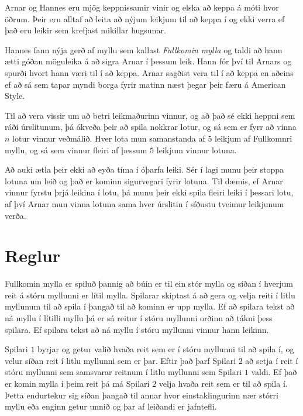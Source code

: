 

Arnar og Hannes eru mjög keppnissamir vinir og elska að keppa á móti hvor öðrum. Þeir
eru alltaf að leita að nýjum leikjum til að keppa í og ekki verra ef það eru leikir
sem krefjast mikillar hugsunar.

Hannes fann nýja gerð af myllu sem kallast \emph{Fullkomin mylla}
og taldi að hann ætti góðan möguleika á að sigra Arnar í þessum leik. Hann fór því
til Arnars og spurði hvort hann væri til í að keppa. Arnar sagðist vera til í að keppa
en aðeins ef að sá sem tapar myndi borga fyrir matinn næst þegar þeir færu á 
American Style.

Til að vera vissir um að betri leikmaðurinn vinnur, og að það sé ekki heppni
sem ráði úrslitunum, þá ákveða þeir að spila nokkrar lotur, og sá sem er fyrr
að vinna $n$ lotur vinnur veðmálið. Hver lota mun samanstanda af $5$ leikjum af
Fullkomnri myllu, og sá sem vinnur fleiri af þessum $5$ leikjum vinnur lotuna.

Að auki ætla þeir ekki að eyða tíma í óþarfa leiki. Sér í lagi munu þeir stoppa
lotuna um leið og það er kominn sigurvegari fyrir lotuna. Til dæmis, ef Arnar
vinnur fyrstu þrjá leikina í lotu, þá munu þeir ekki spila fleiri leiki í
þessari lotu, af því Arnar mun vinna lotuna sama hver úrslitin í síðustu
tveimur leikjunum verða.

\section*{Reglur}
Fullkomin mylla er spiluð þannig að búin er til ein stór mylla og síðan í hverjum
reit á stóru myllunni er lítil mylla. Spilarar skiptast á að gera og velja reiti í litlu
myllunum til að spila í þangað til að kominn er upp mylla. Ef að spilara tekst að ná
myllu í lítilli myllu þá er sá reitur í stóru myllunni orðinn að tákni þess spilara.
Ef spilara tekst að ná myllu í stóru myllunni vinnur hann leikinn.

Spilari $1$ byrjar og getur valið hvaða reit sem er í stóru myllunni til að spila
í, og velur síðan reit í litlu myllunni sem er þar. Eftir það þarf Spilari $2$
að setja í reit í stóru myllunni sem samsvarar reitnum í litlu myllunni
sem Spilari $1$ valdi. Ef það er komin mylla í þeim reit þá má Spilari $2$
velja hvaða reit sem er til að spila í. Þetta endurtekur sig síðan þangað
til annar hvor einstaklingurinn nær stórri myllu eða enginn getur unnið
og þar af leiðandi er jafntefli.

